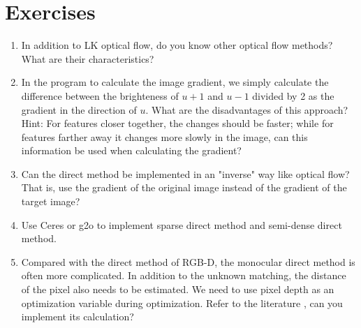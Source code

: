 \section*{Exercises}
\begin{enumerate}
	\item In addition to LK optical flow, do you know other optical flow methods? What are their characteristics?
	\item In the program to calculate the image gradient, we simply calculate the difference between the brighteness of $u+1$ and $u-1$ divided by 2 as the gradient in the direction of $u$. What are the disadvantages of this approach? Hint: For features closer together, the changes should be faster; while for features farther away it changes more slowly in the image, can this information be used when calculating the gradient?
	\item Can the direct method be implemented in an "inverse" way like optical flow? That is, use the gradient of the original image instead of the gradient of the target image?
	\item[\optional] Use Ceres or g2o to implement sparse direct method and semi-dense direct method.
	\item Compared with the direct method of RGB-D, the monocular direct method is often more complicated. In addition to the unknown matching, the distance of the pixel also needs to be estimated. We need to use pixel depth as an optimization variable during optimization. Refer to the literature \cite{Engel2013, Engel2014}, can you implement its calculation?
\end{enumerate}


